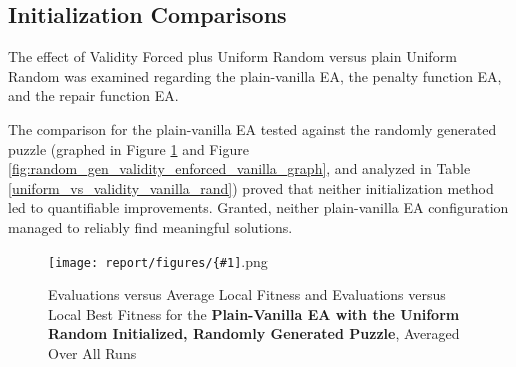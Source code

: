 \documentclass[11pt]{article}
\newcommand{\fitnessplotcaption}[1]{\caption{Evaluations versus Average Local Fitness and Evaluations versus 
    Local Best Fitness for the \textbf{{#1}}, Averaged Over All Runs}}
\newcommand{\addgraphic}[1]{\centerline{\texttt{[image: report/figures/\{\#1]}.png}}}
\begin{document}
\subsection{Initialization Comparisons}

The effect of Validity Forced plus Uniform Random versus plain Uniform Random was examined
regarding the plain-vanilla EA, the penalty function EA, and the repair function EA.

The comparison for the plain-vanilla EA tested against the randomly generated puzzle
(graphed in Figure \ref{fig:random_gen_uniform_random_vanilla_graph}
and Figure \ref{fig:random_gen_validity_enforced_vanilla_graph}, and analyzed in Table \ref{uniform_vs_validity_vanilla_rand})
proved that neither initialization method led to quantifiable improvements. Granted, neither plain-vanilla EA configuration
managed to reliably find meaningful solutions.

\begin{figure}[H]
    \addgraphic{random_gen_uniform_random_vanilla_graph}
    \fitnessplotcaption{Plain-Vanilla EA with the Uniform Random Initialized, Randomly Generated Puzzle}
    \label{fig:random_gen_uniform_random_vanilla_graph}
\end{figure}
\end{document}
